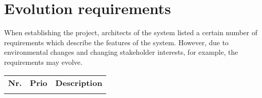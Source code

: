 \section{Evolution requirements}

When establishing the project, architects of the system listed a certain number of requirements which describe the features of the system. However, due to environmental changes and changing stakeholder interests, for example, the requirements may evolve.


\begin{longtable}{L{0.1\textwidth} L{0.12\textwidth} L{0.7\textwidth}}
	\textbf{Nr.} & \textbf{Prio}  & \textbf{Description} \\

	
	 
	\bottomrule
\end{longtable}



 
